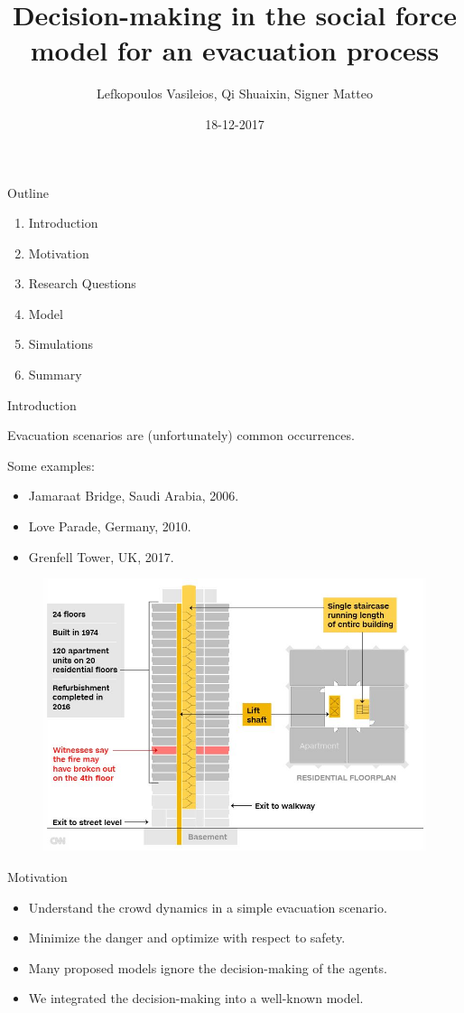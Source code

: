 \documentclass[aspectratio=43]{beamer}
\author[LQS]{Lefkopoulos Vasileios, Qi Shuaixin, Signer Matteo}
\title{Decision-making in the social force model for an evacuation process}
\date{18-12-2017}
\begin{document}
\titleframe


\begin{frame}{Outline}
	\begin{enumerate}
		\item Introduction
		\smallskip
		\item Motivation
		\smallskip
		\item Research Questions
		\smallskip
		\item Model
		\smallskip
		\item Simulations
		\smallskip
		\item Summary
	\end{enumerate}
\end{frame}


\begin{frame}{Introduction}
	\pause
	
	Evacuation scenarios are (unfortunately) common occurrences.
	
	\bigskip
	\pause
	
	Some examples:
	\begin{itemize}
		\item Jamaraat Bridge, Saudi Arabia, 2006. \\
		\item Love Parade, Germany, 2010. \\
		\item Grenfell Tower, UK, 2017. \\
	\end{itemize}

	\begin{figure}
		\centering
		\includegraphics[width=0.5\linewidth]{grenfell_tower.jpg}
	\end{figure}
\end{frame}


\begin{frame}{Motivation}
	\pause
	
	\begin{itemize}
		\item Understand the crowd dynamics in a simple evacuation scenario. \\
		\bigskip
		\item Minimize the danger and optimize with respect to safety. \\
		\bigskip
		\pause
		\item Many proposed models ignore the decision-making of the agents. \\
		\bigskip
		\item We integrated the decision-making into a well-known model.
	\end{itemize}
\end{frame}
\end{document}

